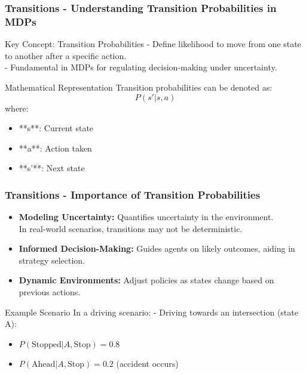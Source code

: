 \documentclass{beamer}
\begin{document}
\begin{frame}[fragile]
    \frametitle{Transitions - Understanding Transition Probabilities in MDPs}

    \begin{block}{Key Concept: Transition Probabilities}
        - Define likelihood to move from one state to another after a specific action. \\
        - Fundamental in MDPs for regulating decision-making under uncertainty.
    \end{block}

    \begin{block}{Mathematical Representation}
        Transition probabilities can be denoted as:
        \begin{equation}
            P(s' | s, a)
        \end{equation}
        where:
        \begin{itemize}
            \item **s**: Current state
            \item **a**: Action taken
            \item **s'**: Next state
        \end{itemize}
    \end{block}
\end{frame}

\begin{frame}[fragile]
    \frametitle{Transitions - Importance of Transition Probabilities}

    \begin{itemize}
        \item \textbf{Modeling Uncertainty:} Quantifies uncertainty in the environment. \\
        In real-world scenarios, transitions may not be deterministic.
        
        \item \textbf{Informed Decision-Making:} Guides agents on likely outcomes, aiding in strategy selection.
        
        \item \textbf{Dynamic Environments:} Adjust policies as states change based on previous actions.
    \end{itemize}

    \begin{block}{Example Scenario}
        In a driving scenario:
        - Driving towards an intersection (state A):
          \begin{itemize}
              \item $P(\text{Stopped} | A, \text{Stop}) = 0.8$
              \item $P(\text{Ahead} | A, \text{Stop}) = 0.2$ (accident occurs)
          \end{itemize}
    \end{block}
\end{frame}
\end{document}
